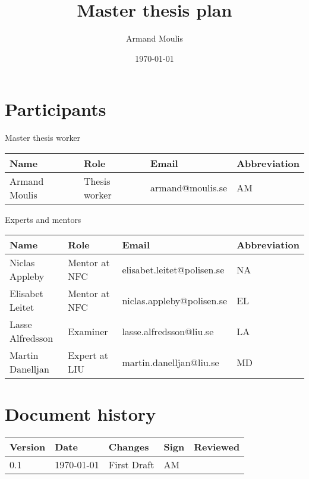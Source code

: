 \documentclass{article}
\begin{document}
	



\title{Master thesis plan}
\author{Armand Moulis}
\date{\today}
\maketitle
\newpage

\section*{Participants}

\begin{center}
	Master thesis worker
\end{center}

\begin{center}
	\begin{tabular}{|l|l|l|l|}
		\hline
		Name          & Role          & Email            & Abbreviation \\ \hline
		Armand Moulis & Thesis worker & armand@moulis.se & AM           \\ \hline
	\end{tabular}
\end{center}

\begin{center}
	Experts and mentors
\end{center}

\begin{center}
	\begin{tabular}{|l|l|l|l|}
		\hline
		Name             & Role          & Email                      & Abbreviation \\ \hline
		Niclas Appleby   & Mentor at NFC & elisabet.leitet@polisen.se & NA           \\ \hline
		Elisabet Leitet  & Mentor at NFC & niclas.appleby@polisen.se  & EL           \\ \hline
		Lasse Alfredsson & Examiner      & lasse.alfredsson@liu.se    & LA           \\ \hline
		Martin Danelljan & Expert at LIU & martin.danelljan@liu.se    & MD           \\ \hline
	\end{tabular}
\end{center}
\newpage


\newpage
\setcounter{tocdepth}{3}
\tableofcontents
\newpage

\section*{Document history}
\begin{center}
	\begin{tabular}{|l|l| p{5cm} |l|l| }
		\hline
		Version &  Date  & Changes     & Sign & Reviewed \\ \hline
		  0.1   & \today & First Draft & AM   &  \\ \hline
	\end{tabular}
\end{center}
\newpage
\end{document}
